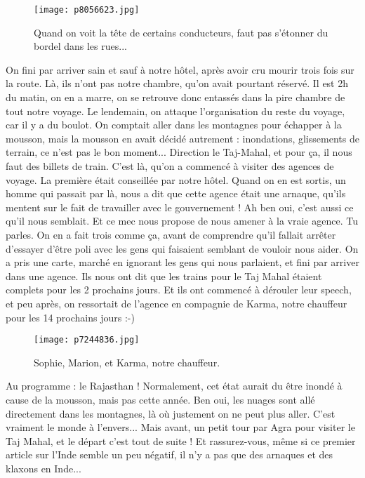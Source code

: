 \documentclass{book}
\begin{document}
\begin{figure}[h]
\centering
\texttt{[image: p8056623.jpg]}
\caption*{Quand on voit la tête de certains conducteurs, faut pas s'étonner du bordel dans les rues...}
\end{figure}

On fini par arriver sain et sauf à notre hôtel, après avoir cru mourir trois fois sur la route. Là, ils n'ont pas notre chambre, qu'on avait pourtant réservé. Il est 2h du matin, on en a marre, on se retrouve donc entassés dans la pire chambre de tout notre voyage. Le lendemain, on attaque l'organisation du reste du voyage, car il y a du boulot. On comptait aller dans les montagnes pour échapper à la mousson, mais la mousson en avait décidé autrement : inondations, glissements de terrain, ce n'est pas le bon moment... Direction le Taj-Mahal, et pour ça, il nous faut des billets de train. C'est là, qu'on a commencé à visiter des agences de voyage. La première était conseillée  par notre hôtel. Quand on en est sortis, un homme qui passait par là, nous a dit que cette agence était une arnaque, qu'ils mentent sur le fait de travailler avec le gouvernement ! Ah ben oui, c'est aussi ce qu'il nous semblait. Et ce mec nous propose de nous amener à la vraie agence. Tu parles. On en a fait trois comme ça, avant de comprendre qu'il fallait arrêter d'essayer d'être poli avec les gens qui faisaient semblant de vouloir nous aider. On a pris une carte, marché en ignorant les gens qui nous parlaient, et fini par arriver dans une agence. Ils nous ont dit que les trains pour le Taj Mahal étaient complets pour les 2 prochains jours. Et ils ont commencé à dérouler leur speech, et peu après, on ressortait de l'agence en compagnie de Karma, notre chauffeur pour les 14 prochains jours :-)


\begin{figure}[h]
\centering
\texttt{[image: p7244836.jpg]}
\caption*{Sophie, Marion, et Karma, notre chauffeur.}
\end{figure}

Au programme : le Rajasthan ! Normalement, cet état aurait du être inondé à cause de la mousson, mais pas cette année. Ben oui, les nuages sont allé directement dans les montagnes, là où justement on ne peut plus aller. C'est vraiment le monde à l'envers... Mais avant, un petit tour par Agra pour visiter le Taj Mahal, et le départ c'est tout de suite ! Et rassurez-vous, même si ce premier article sur l'Inde semble un peu négatif, il n'y a pas que des arnaques et des klaxons en Inde...
\end{document}
